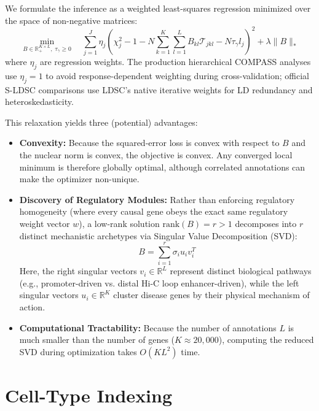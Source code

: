 \documentclass[11pt]{article}
\begin{document}
We formulate the inference as a weighted least-squares regression minimized over the space of non-negative matrices:
\begin{equation}
    \min_{B \in \mathbb{R}_{+}^{K \times L}, \; \tau_\gamma \ge 0} \quad \sum_{j=1}^J \eta_j \left( \chi_j^2 - 1 - N \sum_{k=1}^K \sum_{l=1}^L B_{kl} \mathcal{T}_{jkl} - N \tau_\gamma l_j \right)^2 + \lambda \|B\|_*
\end{equation}
where $\eta_j$ are regression weights. The production hierarchical COMPASS analyses use $\eta_j=1$ to avoid response-dependent weighting during cross-validation; official S-LDSC comparisons use LDSC's native iterative weights for LD redundancy and heteroskedasticity.

This relaxation yields three (potential) advantages:
\begin{itemize}
    \item \textbf{Convexity:} Because the squared-error loss is convex with respect to $B$ and the nuclear norm is convex, the objective is convex. Any converged local minimum is therefore globally optimal, although correlated annotations can make the optimizer non-unique.
    \item \textbf{Discovery of Regulatory Modules:} Rather than enforcing regulatory homogeneity (where every causal gene obeys the exact same regulatory weight vector $w$), a low-rank solution $\text{rank}(B) = r > 1$ decomposes into $r$ distinct mechanistic archetypes via Singular Value Decomposition (SVD):
    \begin{equation}
        B = \sum_{i=1}^r \sigma_i u_i v_i^T
    \end{equation}
    Here, the right singular vectors $v_i \in \mathbb{R}^L$ represent distinct biological pathways (e.g., promoter-driven vs. distal Hi-C loop enhancer-driven), while the left singular vectors $u_i \in \mathbb{R}^K$ cluster disease genes by their physical mechanism of action.
    \item \textbf{Computational Tractability:} Because the number of annotations $L$ is much smaller than the number of genes ($K \approx 20,000$), computing the reduced SVD during optimization takes $O(K L^2)$ time.
\end{itemize}

\section{Cell-Type Indexing}
\end{document}
